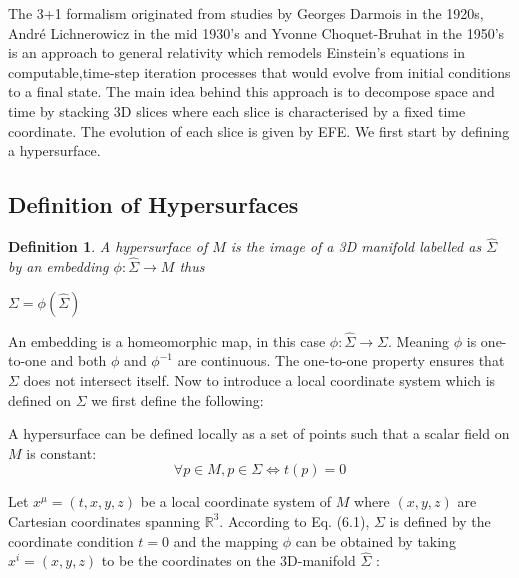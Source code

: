 \documentclass[12pt]{article}
\numberwithin{equation}{section}
\numberwithin{theorem}{subsection}
\newtheorem{definition}[theorem]{Definition}
\begin{document}
\newline

The 3+1 formalism originated from studies by Georges Darmois in the 1920s, Andr\'e Lichnerowicz in the mid 1930's and Yvonne Choquet-Bruhat in the 1950's is an approach to general relativity which remodels Einstein's equations in computable,time-step iteration processes that would evolve from initial conditions to a final state. The main idea behind this approach is to decompose space and time by stacking 3D slices where each slice is characterised by a fixed time coordinate. The evolution of each slice is given by EFE. We first start by defining a hypersurface.

\subsection{Definition of Hypersurfaces}

\begin{definition}

A hypersurface of $M$ is the image of a 3D manifold labelled as $\hat{\Sigma}$ by an embedding $\phi:\hat{\Sigma} \rightarrow{M}$ thus

\begin{center}

    $\Sigma = \phi(\hat{\Sigma})$

\end{center}

\end{definition}

An embedding is a homeomorphic map, in this case $\phi: \hat{\Sigma} \rightarrow \Sigma$. Meaning $\phi$ is one-to-one and both $\phi$ and $\phi^{-1}$ are continuous. The one-to-one property ensures that $\Sigma$ does not intersect itself. Now to introduce a local coordinate system which is defined on $\Sigma$ we first define the following:

\newline

A hypersurface can be defined locally as a set of points such that a scalar field on $M$ is constant: \begin{equation}

    \forall p \in M, p \in \Sigma \iff t(p)=0 

\end{equation}

Let $x^{\mu}=(t,x,y,z)$ be a local coordinate system of $M$ where $(x,y,z)$ are Cartesian coordinates spanning $\mathbb{R}^{3}$. According to Eq. (6.1), $\Sigma$ is defined by the coordinate condition $t=0$ and the mapping $\phi$ can be obtained by taking $x^i=(x,y,z)$ to be the coordinates on the 3D-manifold $\hat{\Sigma}$ :
\end{document}
